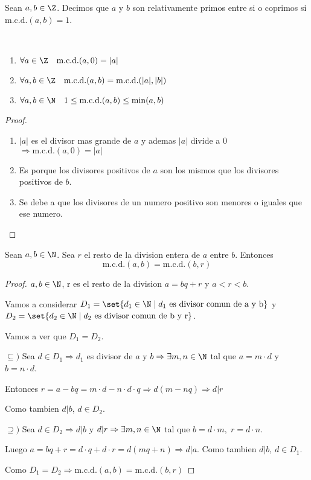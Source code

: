 \begin{definition}
	Sean \(a,b \in \Z \). Decimos que \(a \) y \(b \) son relativamente primos entre si o coprimos si \(\mathrm{m.c.d.}(a,b) = 1 \).
\end{definition}

\begin{proposition}
	~\begin{enumerate}
		\item \(\forall a \in \Z \quad \mathrm{m.c.d.}(a,0) = |a| \)
		\item \(\forall a,b \in \Z \quad \mathrm{m.c.d.}(a,b) = \mathrm{m.c.d.}(|a|,|b|) \)
		\item \(\forall a,b \in \N \quad 1 \leq \mathrm{m.c.d.}(a,b) \leq \mathrm{min}(a,b)  \)
	\end{enumerate}
\end{proposition}
\begin{proof}
	~\begin{enumerate}
		\item \(|a| \) es el divisor mas grande de \(a \) y ademas \(|a| \) divide a 0 \(\Rightarrow \mathrm{m.c.d.}(a,0) = |a| \)
		\item Es porque los divisores positivos de \(a \) son los mismos que los divisores positivos de \(b \).
		\item Se debe a que los divisores de un numero positivo son menores o iguales que ese numero.
	\end{enumerate}
\end{proof}

\begin{proposition}
	\label{mcd}
	Sean \(a,b \in \N \). Sea \(r \) el resto de la division entera de \(a \) entre \(b \). Entonces
	\[
		\mathrm{m.c.d.}(a,b) = \mathrm{m.c.d.}(b,r)
	\]
\end{proposition}

\begin{proof}
	\(a,b \in \N \), r es el resto de la division \(a = bq + r \) y \(a < r < b \).

	Vamos a considerar \(D_1 = \set{d_1 \in \N \mid d_1 \text{ es divisor comun de a y b}}\) y \(D_2 = \set{d_2 \in \N \mid d_2 \text{ es divisor comun de b y r}}\).

	Vamos a ver que \(D_1 = D_2 \).

	\(\subseteq )\) Sea \(d \in D_1 \Rightarrow d_1 \) es divisor de \(a \) y \(b \Rightarrow \exists m,n \in \N\) tal que \(a = m \cdot d \) y \(b = n \cdot d \).

	Entonces \(r = a - bq = m \cdot d - n \cdot d \cdot q \Rightarrow d(m - nq) \Rightarrow d | r \)

	Como tambien \(d | b \), \(d \in D_2 \).

	\(\supseteq ) \) Sea \(d \in D_2 \Rightarrow d | b \) y \(d | r  \Rightarrow \exists m,n \in \N\) tal que \(b = d \cdot m, \; r = d \cdot n \).

	Luego \(a = bq + r = d \cdot q + d \cdot r = d (mq + n ) \Rightarrow d | a \). Como tambien \(d | b \), \(d \in D_1 \).

	Como \(D_1 = D_2 \Rightarrow \mathrm{m.c.d.}(a,b) = \mathrm{m.c.d.}(b,r)  \)
\end{proof}

